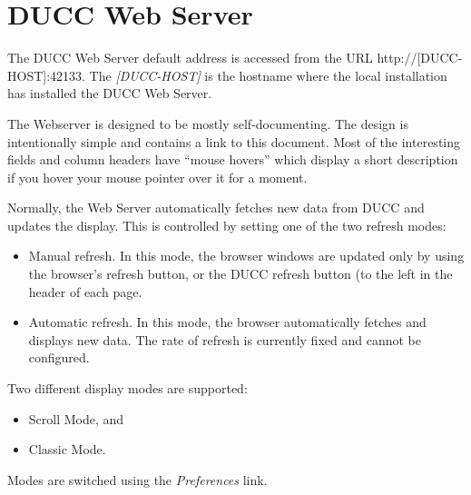 % 
% 
% 
% 
\ifpdf
\else
{}
\fi
\chapter{DUCC Web Server}

    The DUCC Web Server default address is accessed from the URL http://[DUCC-HOST]:42133.  The
    {\em[DUCC-HOST]} is the hostname where the local installation has installed the DUCC
    Web Server. 

    The Webserver is designed to be mostly self-documenting. The design is intentionally simple 
    and contains a link to this document.  Most of the interesting fields and column headers
    have ``mouse hovers'' which display a short 
    description if you hover your mouse pointer over it for a moment.

    Normally, the Web Server automatically fetches new data from DUCC and updates the display.
    This is controlled by setting one of the two refresh modes:
    \begin{itemize}
      \item Manual refresh.  In this mode, the browser windows are updated only by using the
        browser's refresh button, or the DUCC refresh button (to the left in the header of
        each page.
      \item Automatic refresh. In this mode, the browser automatically fetches and displays
        new data.  The rate of refresh is currently fixed and cannot be configured.
    \end{itemize}
    
    Two different display modes are supported:
    \begin{itemize}
      \item Scroll Mode, and
      \item Classic Mode.
    \end{itemize}
    Modes are switched using the {\em Preferences} link.

